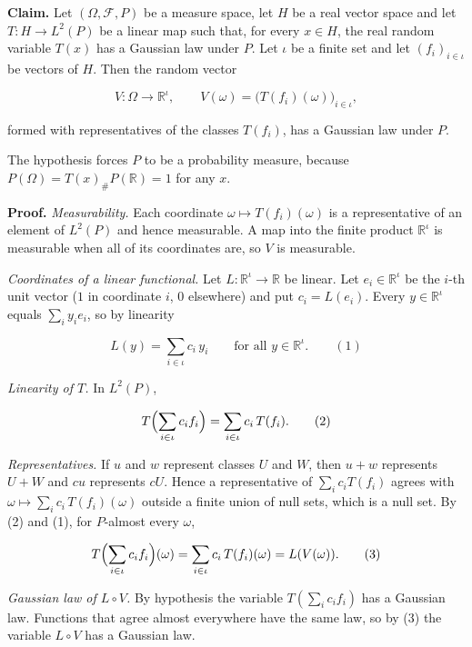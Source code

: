 \documentclass[11pt,a4paper]{article}
\begin{document}
\textbf{Claim.} Let \((\Omega,\mathcal F,P)\) be a measure space, let \(H\) be a real vector space and let \(T:H\to L^2(P)\) be a linear map such that, for every \(x\in H\), the real random variable \(T(x)\) has a Gaussian law under \(P\). Let \(\iota\) be a finite set and let \((f_i)_{i\in\iota}\) be vectors of \(H\). Then the random vector


\[V:\Omega\to\mathbb R^\iota,\qquad V(\omega)=\bigl(T(f_i)(\omega)\bigr)_{i\in\iota},\]


formed with representatives of the classes \(T(f_i)\), has a Gaussian law under \(P\).




The hypothesis forces \(P\) to be a probability measure, because \(P(\Omega)=T(x)_\#P(\mathbb R)=1\) for any \(x\).




\textbf{Proof.} \emph{Measurability.} Each coordinate \(\omega\mapsto T(f_i)(\omega)\) is a representative of an element of \(L^2(P)\) and hence measurable. A map into the finite product \(\mathbb R^\iota\) is measurable when all of its coordinates are, so \(V\) is measurable.




\emph{Coordinates of a linear functional.} Let \(L:\mathbb R^\iota\to\mathbb R\) be linear. Let \(e_i\in\mathbb R^\iota\) be the \(i\)-th unit vector (\(1\) in coordinate \(i\), \(0\) elsewhere) and put \(c_i=L(e_i)\). Every \(y\in\mathbb R^\iota\) equals \(\sum_iy_ie_i\), so by linearity


\[L(y)=\sum_{i\in\iota}c_i\,y_i\qquad\text{for all }y\in\mathbb R^\iota.\qquad(1)\]


\emph{Linearity of \(T\).} In \(L^2(P)\),


\[T\Bigl(\sum_{i\in\iota}c_if_i\Bigr)=\sum_{i\in\iota}c_i\,T(f_i).\qquad(2)\]


\emph{Representatives.} If \(u\) and \(w\) represent classes \(U\) and \(W\), then \(u+w\) represents \(U+W\) and \(cu\) represents \(cU\). Hence a representative of \(\sum_ic_iT(f_i)\) agrees with \(\omega\mapsto\sum_ic_i\,T(f_i)(\omega)\) outside a finite union of null sets, which is a null set. By (2) and (1), for \(P\)-almost every \(\omega\),


\[T\Bigl(\sum_{i\in\iota}c_if_i\Bigr)(\omega)=\sum_{i\in\iota}c_i\,T(f_i)(\omega)=L(V(\omega)).\qquad(3)\]


\emph{Gaussian law of \(L\circ V\).} By hypothesis the variable \(T(\sum_ic_if_i)\) has a Gaussian law. Functions that agree almost everywhere have the same law, so by (3) the variable \(L\circ V\) has a Gaussian law.
\end{document}
